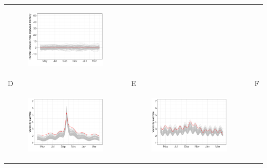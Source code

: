 \documentclass[11pt]{article}
\begin{document}
\begin{suppfigure}[ht]
\begin{tabular}{lll}
\begin{subfigure}[t]{0.30\linewidth}
		\includegraphics[width=1\linewidth]{figs/supp-figure-10c.pdf}
	\end{subfigure}\\
	D&E&F\\
	\begin{subfigure}[t]{0.30\linewidth}
		\centering
		\includegraphics[width=1\linewidth]{figs/supp-figure-10d.pdf} 
	\end{subfigure}&
	\begin{subfigure}[t]{0.30\linewidth}
		\centering
		\includegraphics[width=1\linewidth]{figs/supp-figure-10e.pdf}

\end{subfigure}
\end{tabular}
\end{suppfigure}
\end{document}
